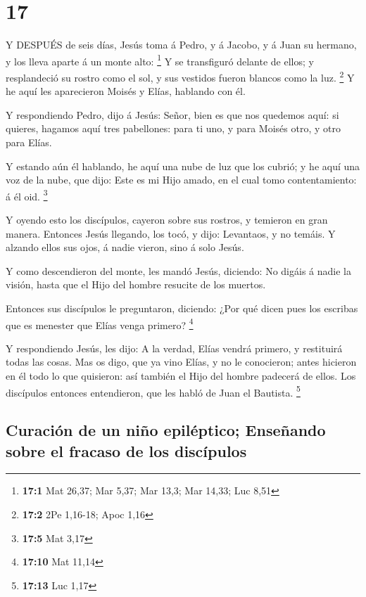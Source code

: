 \hypertarget{section-16}{%
\section{17}\label{section-16}}

 Y DESPUÉS de seis días, Jesús toma á Pedro, y á Jacobo, y á
Juan su hermano, y los lleva aparte á un monte alto: \footnote{\textbf{17:1}
  Mat 26,37; Mar 5,37; Mar 13,3; Mar 14,33; Luc 8,51}  Y se
transfiguró delante de ellos; y resplandeció su rostro como el sol, y
sus vestidos fueron blancos como la luz. \footnote{\textbf{17:2} 2Pe
  1,16-18; Apoc 1,16}  Y he aquí les aparecieron Moisés y
Elías, hablando con él.

 Y respondiendo Pedro, dijo á Jesús: Señor, bien es que nos
quedemos aquí: si quieres, hagamos aquí tres pabellones: para ti uno, y
para Moisés otro, y otro para Elías.

 Y estando aún él hablando, he aquí una nube de luz que los
cubrió; y he aquí una voz de la nube, que dijo: Este es mi Hijo amado,
en el cual tomo contentamiento: á él oid. \footnote{\textbf{17:5} Mat
  3,17}

 Y oyendo esto los discípulos, cayeron sobre sus rostros, y
temieron en gran manera.  Entonces Jesús llegando, los tocó,
y dijo: Levantaos, y no temáis.  Y alzando ellos sus ojos, á
nadie vieron, sino á solo Jesús.

 Y como descendieron del monte, les mandó Jesús, diciendo:
No digáis á nadie la visión, hasta que el Hijo del hombre resucite de
los muertos.

 Entonces sus discípulos le preguntaron, diciendo: ¿Por qué
dicen pues los escribas que es menester que Elías venga primero?
\footnote{\textbf{17:10} Mat 11,14}

 Y respondiendo Jesús, les dijo: A la verdad, Elías vendrá
primero, y restituirá todas las cosas.  Mas os digo, que ya
vino Elías, y no le conocieron; antes hicieron en él todo lo que
quisieron: así también el Hijo del hombre padecerá de ellos.
 Los discípulos entonces entendieron, que les habló de Juan
el Bautista. \footnote{\textbf{17:13} Luc 1,17}

\hypertarget{curaciuxf3n-de-un-niuxf1o-epiluxe9ptico-enseuxf1ando-sobre-el-fracaso-de-los-discuxedpulos}{%
\subsection{Curación de un niño epiléptico; Enseñando sobre el fracaso
de los
discípulos}\label{curaciuxf3n-de-un-niuxf1o-epiluxe9ptico-enseuxf1ando-sobre-el-fracaso-de-los-discuxedpulos}}

